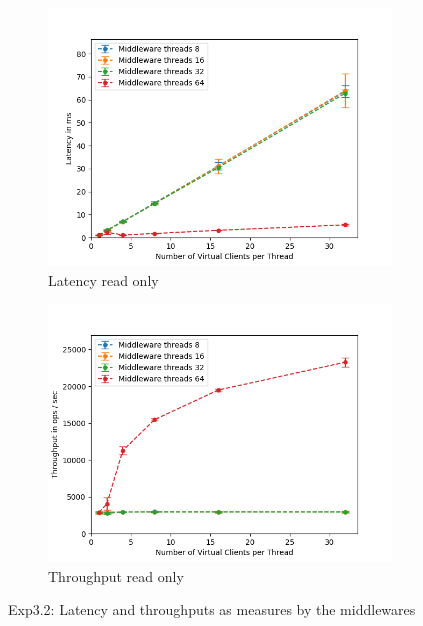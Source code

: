 \documentclass[11pt,a4paper]{article}
\begin{document}
\begin{figure}[H]
\centering
\begin{subfigure}{.5\textwidth}
    \centering
    \includegraphics[width=\textwidth]{img/exp3_2/exp3_2__latency_middleware_write_0.png}
    \caption{Latency read only}
    \label{fig:mesh1}
\end{subfigure}%
\begin{subfigure}{.5\textwidth}
      \centering
    \includegraphics[width=\textwidth]{img/exp3_2/exp3_2__throughput_middleware_write_0.png}
    \caption{Throughput read only}
    \label{fig:mesh1}
\end{subfigure}
\caption{Exp3.2: Latency and throughputs as measures by the middlewares}
\label{fig:test}
\end{figure}
\end{document}
